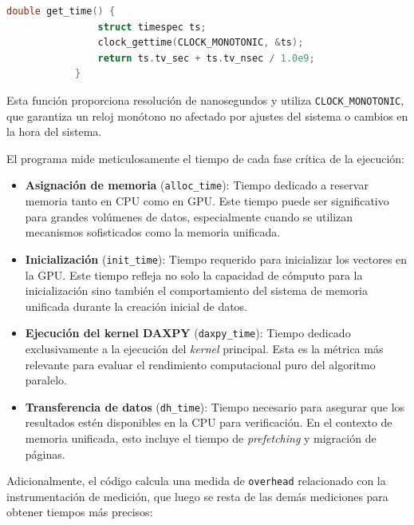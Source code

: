         \begin{lstlisting}[language=C, caption={Función para obtener la hora actual.}, gobble=12]
            double get_time() {
                struct timespec ts;
                clock_gettime(CLOCK_MONOTONIC, &ts);
                return ts.tv_sec + ts.tv_nsec / 1.0e9;
            }
        \end{lstlisting}

        Esta función proporciona resolución de nanosegundos y utiliza \texttt{CLOCK\_MONOTONIC}, que garantiza un reloj monótono no afectado por ajustes del sistema o cambios en la hora del sistema.

        El programa mide meticulosamente el tiempo de cada fase crítica de la ejecución:
        
        \begin{itemize}
        
            \item \textbf{Asignación de memoria} (\texttt{alloc\_time}): Tiempo dedicado a reservar memoria tanto en CPU como en GPU. Este tiempo puede ser significativo para grandes volúmenes de datos, especialmente cuando se utilizan mecanismos sofisticados como la memoria unificada.
            
            \item \textbf{Inicialización} (\texttt{init\_time}): Tiempo requerido para inicializar los vectores en la GPU. Este tiempo refleja no solo la capacidad de cómputo para la inicialización sino también el comportamiento del sistema de memoria unificada durante la creación inicial de datos.
            
            \item \textbf{Ejecución del kernel DAXPY} (\texttt{daxpy\_time}): Tiempo dedicado exclusivamente a la ejecución del \textit{kernel} principal. Esta es la métrica más relevante para evaluar el rendimiento computacional puro del algoritmo paralelo.
            
            \item \textbf{Transferencia de datos} (\texttt{dh\_time}): Tiempo necesario para asegurar que los resultados estén disponibles en la CPU para verificación. En el contexto de memoria unificada, esto incluye el tiempo de \textit{prefetching} y migración de páginas.
            
        \end{itemize}

        Adicionalmente, el código calcula una medida de \texttt{overhead} relacionado con la instrumentación de medición, que luego se resta de las demás mediciones para obtener tiempos más precisos:
        
